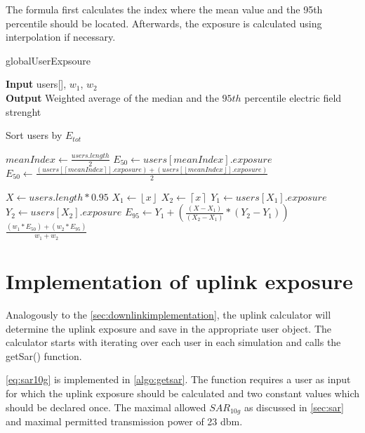 The formula first calculates the index where the mean value and the 95th percentile should be located. Afterwards, the exposure is calculated using interpolation if necessary.

\begin{algorithm}
	\caption{globalUserExpsoure} 
	\label{alg:getglobaluserexposure}
     \hspace*{\algorithmicindent} \textbf{Input} users[], $w_1$, $w_2$\\
     \hspace*{\algorithmicindent} \textbf{Output} Weighted average of the median  and the $95th$ percentile electric field strenght
	\begin{algorithmic}[1]
		\State Sort users by $E_{tot}$
		
		\State $meanIndex \gets \frac{users.length}{2}$
			\State $E_{50} \gets users[meanIndex].exposure$ 
		\Else
			\State $E_{50} \gets \frac{(users[ \left \lceil{meanIndex}\right \rceil ].exposure) + (users[ \left \lfloor{meanIndex}\right \rfloor ].exposure)}{2}$ 
		\EndIf

		\State $ X \gets users.length * 0.95$ 
		\State $ X_1 \gets \left \lfloor{x}\right \rfloor $ 
		\State $ X_2 \gets \left \lceil{x}\right \rceil $ 
		\State $ Y_1 \gets users[X_1].exposure$ 
		\State $ Y_2 \gets users[X_2].exposure$ 
		\State $E_{95} \gets  Y_1 + \left(\frac{(X - X_1)}{(X_2 - X_1)}* (Y_2 - Y_1)\right)$\\
		\Return $\frac{(w_1* E_{50})+ (w_2 * E_{95})}{w_1 + w_2}$
	\end{algorithmic} 
\end{algorithm}

\section{Implementation of uplink exposure}
\label{sec:uplinkexposure}

Analogously to the \ref{sec:downlinkimplementation}, the uplink calculator will determine the uplink exposure and save in the appropriate user object. The calculator starts with iterating over each user in each simulation and calls the getSar() function.

\ref{eq:sar10g} is implemented in \ref{algo:getsar}. The function requires a user as input for which the uplink exposure should be calculated and two constant values which should be declared once. The maximal allowed $SAR_{10g}$ as discussed in \ref{sec:sar} and maximal permitted transmission power of 23 dbm.

